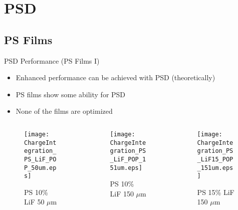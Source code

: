 
% 
%
\section{PSD}

\subsection{PS Films}
\begin{frame}{PSD Performance (PS Films I)}
\small
\begin{itemize}
	\item Enhanced performance can be achieved with PSD (theoretically)
	\item PS films show some ability for PSD
	\item None of the films are optimized \cite{zaitseva_plastic_2012}
\end{itemize}
\begin{columns}[onlytextwidth]
\begin{column}{0.30\textwidth}
	\tiny
	\begin{figure}
		\centering
		\texttt{[image: ChargeIntegration\_PS\_LiF\_POP\_50um.eps]}
		\caption{PS 10\% LiF 50 $\mu$m}
	\end{figure}
\end{column}
\begin{column}{0.30\textwidth}
	\tiny
	\begin{figure}
		\centering
		\texttt{[image: ChargeIntegration\_PS\_LiF\_POP\_151um.eps]}
		\caption{PS 10\% LiF 150 $\mu$m}
	\end{figure}
\end{column}
\begin{column}{0.30\textwidth}
	\tiny
	\begin{figure}
		\centering
		\texttt{[image: ChargeIntegration\_PS\_LiF15\_POP\_151um.eps]}
		\caption{PS 15\% LiF 150 $\mu$m}
	\end{figure}
\end{column}
\end{columns}
\end{frame}
